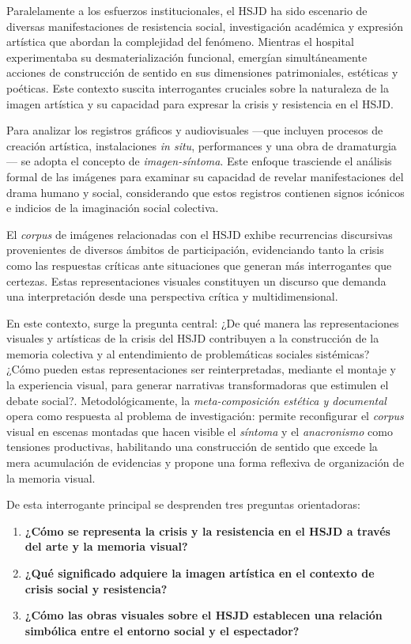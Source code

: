 Paralelamente a los esfuerzos institucionales, el HSJD ha sido escenario de diversas manifestaciones de resistencia social, investigación académica y expresión artística que abordan la complejidad del fenómeno. Mientras el hospital experimentaba su desmaterialización funcional, emergían simultáneamente acciones de construcción de sentido en sus dimensiones patrimoniales, estéticas y poéticas. Este contexto suscita interrogantes cruciales sobre la naturaleza de la imagen artística y su capacidad para expresar la crisis y resistencia en el HSJD.

Para analizar los registros gráficos y audiovisuales —que incluyen procesos de creación artística, instalaciones \textit{in situ}, performances y una obra de dramaturgia— se adopta el concepto de \textit{imagen-síntoma}. Este enfoque trasciende el análisis formal de las imágenes para examinar su capacidad de revelar manifestaciones del drama humano y social, considerando que estos registros contienen signos icónicos e indicios de la imaginación social colectiva.

El \textit{corpus} de imágenes relacionadas con el HSJD exhibe recurrencias discursivas provenientes de diversos ámbitos de participación, evidenciando tanto la crisis como las respuestas críticas ante situaciones que generan más interrogantes que certezas. Estas representaciones visuales constituyen un discurso que demanda una interpretación desde una perspectiva crítica y multidimensional.

En este contexto, surge la pregunta central: ¿De qué manera las representaciones visuales y artísticas de la crisis del HSJD contribuyen a la construcción de la memoria colectiva y al entendimiento de problemáticas sociales sistémicas? ¿Cómo pueden estas representaciones ser reinterpretadas, mediante el montaje y la experiencia visual, para generar narrativas transformadoras que estimulen el debate social?. \textcolor{edit30sept}{Metodológicamente, la \textit{meta-composición estética y documental} opera como respuesta al problema de investigación: permite reconfigurar el \textit{corpus} visual en escenas montadas que hacen visible el \textit{síntoma} y el \textit{anacronismo} como tensiones productivas, habilitando una construcción de sentido que excede la mera acumulación de evidencias y propone una forma reflexiva de organización de la memoria visual.}

De esta interrogante principal se desprenden tres preguntas orientadoras:

\begin{enumerate}
    \item \textbf{¿Cómo se representa la crisis y la resistencia en el HSJD a través del arte y la memoria visual?}

    \item \textbf{¿Qué significado adquiere la imagen artística en el contexto de crisis social y resistencia?}

    \item \textbf{¿Cómo las obras visuales sobre el HSJD establecen una relación simbólica entre el entorno social y el espectador?}
\end{enumerate}


